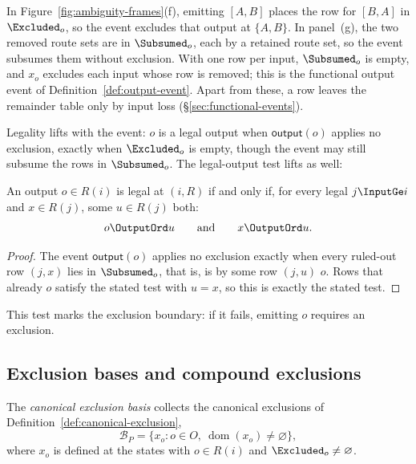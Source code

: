 In Figure~\ref{fig:ambiguity-frames}(f), emitting $[A,B]$ places the row for
$[B,A]$ in $\Excluded_o$, so the event excludes that output at $\{A,B\}$.
In panel~(g), the two removed route sets are in $\Subsumed_o$, each
\outrelpast by a retained route set, so the event subsumes them without
exclusion.  With one row per input, $\Subsumed_o$ is empty, and $x_o$ excludes
each input whose row is removed; this is the functional output event of
Definition~\ref{def:output-event}.  Apart from these, a row leaves the
remainder table only by input loss (\S\ref{sec:functional-events}).

Legality lifts with the event: $o$ is a legal output when $\mathsf{output}(o)$
applies no exclusion, exactly when $\Excluded_o$ is empty, though the event may
still subsume the rows in $\Subsumed_o$.  The legal-output test lifts as well:

\begin{proposition}
\label{prop:exposability}
An output $o\in R(i)$ is legal at $(i,R)$ if and only if, for every legal
$j\InputGe i$ and $x\in R(j)$, some $u\in R(j)$ \outrel both:
\begin{equation}
  o\OutputOrd u
  \qquad\text{and}\qquad
  x\OutputOrd u.
  \label{eq:safe-exposure}
\end{equation}
\end{proposition}

\begin{proof}
The event $\mathsf{output}(o)$ applies no exclusion exactly when every
ruled-out row $(j,x)$ lies in $\Subsumed_o$, that is, is \outrelpast by some row
$(j,u)$ \outrelpart $o$.  Rows that already \outrelbase $o$ satisfy the stated
test with $u=x$, so this is exactly the stated test.
\end{proof}

This test marks the exclusion boundary: if it fails, emitting $o$ requires an
exclusion.

\subsection{Exclusion bases and compound exclusions}
\label{app:exclusion-bases}

\begin{definition}
\label{def:canonical-exclusion-basis}
The \emph{canonical exclusion basis} collects the canonical exclusions of
Definition~\ref{def:canonical-exclusion},
\begin{equation}
  \mathcal B_P
    =\{x_o:o\in O,\ \operatorname{dom}(x_o)\neq\varnothing\},
  \label{eq:canonical-exclusion-basis-relational}
\end{equation}
where $x_o$ is defined at the states with $o\in R(i)$ and $\Excluded_o\neq\varnothing$.
\end{definition}

